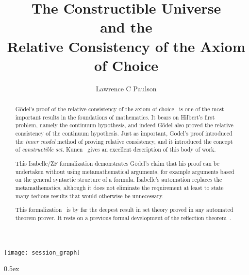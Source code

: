 \documentclass[11pt,a4paper]{article}
\begin{document}
\title{The Constructible Universe\\ and the\\
       Relative Consistency of the Axiom of Choice}
\author{Lawrence C Paulson}
\maketitle

\begin{abstract}
  G\"odel's proof of the relative consistency of the axiom of
  choice~\cite{goedel40} is one of the most important results in the
  foundations of mathematics. It bears on Hilbert's first problem, namely the
  continuum hypothesis, and indeed G\"odel also proved the relative
  consistency of the continuum hypothesis. Just as important, G\"odel's proof
  introduced the \emph{inner model} method of proving relative consistency,
  and it introduced the concept of \emph{constructible
    set}. Kunen~\cite{kunen80} gives an excellent description of this body of
  work.
  
  This Isabelle/ZF formalization demonstrates G\"odel's claim that his proof
  can be undertaken without using metamathematical arguments, for example
  arguments based on the general syntactic structure of a formula. Isabelle's
  automation replaces the metamathematics, although it does not eliminate the
  requirement at least to state many tedious results that would otherwise be
  unnecessary.
  
  This formalization~\cite{paulson-consistency} is by far the deepest result
  in set theory proved in any automated theorem prover. It rests on a previous
  formal development of the reflection theorem~\cite{paulson-reflection}.
\end{abstract}

\tableofcontents

\begin{center}
  \texttt{[image: session\_graph]}
\end{center}

\newpage

\parindent 0pt\parskip 0.5ex





\end{document}
